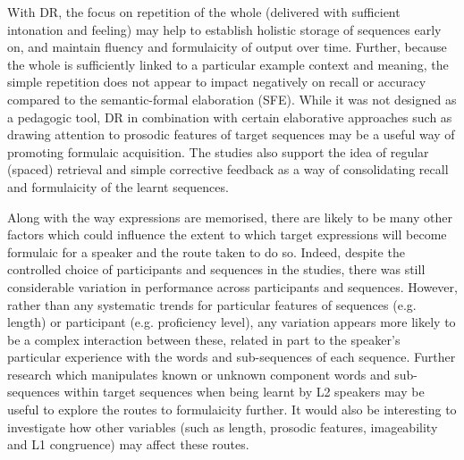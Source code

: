 \documentclass[output=paper]{langscibook}
\begin{document}
With DR, the focus on repetition of the whole (delivered with sufficient intonation and feeling) may help to establish holistic storage of sequences early on, and maintain fluency and formulaicity of output over time. Further, because the whole is sufficiently linked to a particular example context and meaning, the simple repetition does not appear to impact negatively on recall or accuracy compared to the semantic-formal elaboration (SFE). While it was not designed as a pedagogic tool, DR in combination with certain elaborative approaches such as drawing attention to prosodic features of target sequences \citep{BoersEtAl2012} may be a useful way of promoting formulaic acquisition. The studies also support the idea of regular (spaced) retrieval and simple corrective feedback as a way of consolidating recall and formulaicity of the learnt sequences.

Along with the way expressions are memorised, there are likely to be many other factors which could influence the extent to which target expressions will become formulaic for a speaker and the route taken to do so. Indeed, despite the controlled choice of participants and sequences in the studies, there was still considerable variation in performance across participants and sequences. However, rather than any systematic trends for particular features of sequences (e.g. length) or participant (e.g. proficiency level), any variation appears more likely to be a complex interaction between these, related in part to the speaker’s particular experience with the words and sub-sequences of each sequence. Further research which manipulates known or unknown component words and sub-sequences within target sequences when being learnt by L2 speakers may be useful to explore the routes to formulaicity further. It would also be interesting to investigate how other variables (such as length, prosodic features, imageability and L1 congruence) may affect these routes.


{\sloppy\printbibliography[heading=subbibliography,notkeyword=this]}
\end{document}
